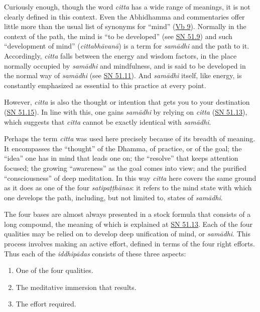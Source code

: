 \documentclass[12pt,openany]{book}%
\begin{document}
Curiously enough, though the word \textit{citta} has a wide range of meanings, it is not clearly defined in this context. Even the Abhidhamma and commentaries offer little more than the usual list of synonyms for “mind” (\href{https://suttacentral.net/vb9}{Vb 9}). Normally in the context of the path, the mind is “to be developed” (see \href{https://suttacentral.net/sn51.9}{SN 51.9}) and such “development of mind” (\textit{\textsanskrit{cittabhāvanā}}) is a term for \textit{\textsanskrit{samādhi}} and the path to it. Accordingly, \textit{citta} falls between the energy and wisdom factors, in the place normally occupied by \textit{\textsanskrit{samādhi}} and mindfulness, and is said to be developed in the normal way of \textit{\textsanskrit{samādhi}} (see \href{https://suttacentral.net/sn51.11}{SN 51.11}). And \textit{\textsanskrit{samādhi}} itself, like energy, is constantly emphasized as essential to this practice at every point.

However, \textit{citta} is also the thought or intention that gets you to your destination (\href{https://suttacentral.net/sn51.15}{SN 51.15}). In line with this, one gains \textit{\textsanskrit{samādhi}} by relying on \textit{citta} (\href{https://suttacentral.net/sn51.13}{SN 51.13}), which suggests that \textit{citta} cannot be exactly identical with \textit{\textsanskrit{samādhi}}.

Perhaps the term \textit{citta} was used here precisely because of its breadth of meaning. It encompasses the “thought” of the Dhamma, of practice, or of the goal; the “idea” one has in mind that leads one on; the “resolve” that keeps attention focused; the growing “awareness” as the goal comes into view; and the purified “consciousness” of deep meditation. In this way \textit{citta} here covers the same ground as it does as one of the four \textit{\textsanskrit{satipaṭṭhānas}}: it refers to the mind state with which one develops the path, including, but not limited to, states of \textit{\textsanskrit{samādhi}}.

The four bases are almost always presented in a stock formula that consists of a long compound, the meaning of which is explained at \href{https://suttacentral.net/sn51.13}{SN 51.13}. Each of the four qualities may be relied on to develop deep unification of mind, or \textit{\textsanskrit{samādhi}}. This process involves making an active effort, defined in terms of the four right efforts. Thus each of the \textit{\textsanskrit{iddhipādas}} consists of these three aspects:

\begin{enumerate}%
\item One of the four qualities.%
\item The meditative immersion that results.%
\item The effort required.%
\end{enumerate}
\end{document}
